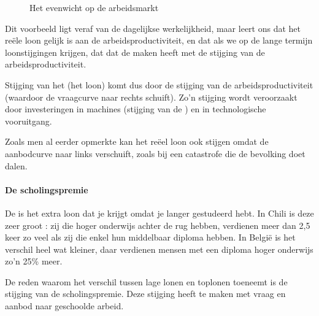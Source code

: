 \begin{figure}[H]
\vspace{0.5cm}
\centering\small
\captionsetup{justification=centering,margin=2cm}
\caption{Het evenwicht op de arbeidsmarkt}
\label{fig:h6arbeideven}
\end{figure}

Dit voorbeeld ligt veraf van de dagelijkse werkelijkheid, maar leert ons dat het re\"ele loon gelijk is aan de arbeidsproductiviteit, en dat als we op de lange termijn loonstijgingen krijgen, dat dat de maken heeft met de stijging van de arbeidsproductiviteit.
\par Stijging van het  (het loon) komt dus door de stijging van de arbeidsproductiviteit (waardoor de vraagcurve naar rechts schuift). Zo'n stijging wordt veroorzaakt door investeringen in machines (stijging van de ) en in technologische vooruitgang.
\par Zoals men al eerder opmerkte kan het re\"eel loon ook stijgen omdat de aanbodcurve naar links verschuift, zoals bij een catastrofe die de bevolking doet dalen.\\

\paragraph{De scholingspremie}

De  is het extra loon dat je krijgt omdat je langer gestudeerd hebt. In Chili is deze zeer groot : zij die hoger onderwijs achter de rug hebben, verdienen meer dan 2,5 keer zo veel als zij die enkel hun middelbaar diploma hebben. In Belgi\"e is het verschil heel wat kleiner, daar verdienen mensen met een diploma hoger onderwijs zo'n 25\% meer.
\par De reden waarom het verschil tussen lage lonen en toplonen toeneemt is de stijging van de scholingspremie. Deze stijging heeft te maken met vraag en aanbod naar geschoolde arbeid. \\

